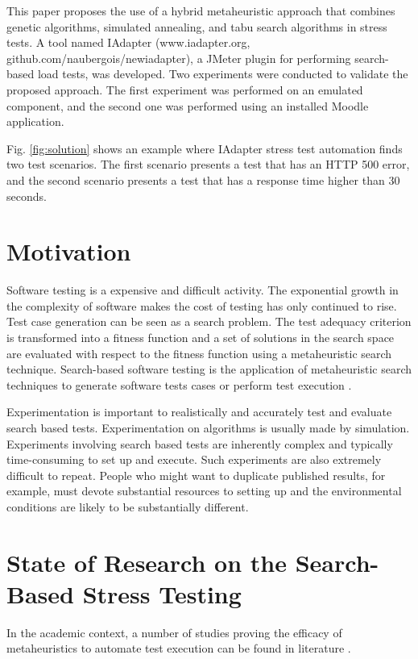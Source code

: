 This paper proposes the use of a hybrid metaheuristic approach that combines genetic algorithms, simulated annealing, and tabu search algorithms in stress tests. A tool named IAdapter (www.iadapter.org, github.com/naubergois/newiadapter), a JMeter plugin for performing search-based load tests, was developed. Two experiments were conducted to validate the proposed approach. The first experiment was performed on an emulated component, and the second one was performed using an installed Moodle application.

Fig. \ref{fig:solution} shows an example where IAdapter stress test automation finds two test scenarios. The first scenario presents a test that has an HTTP 500 error, and the second scenario presents a test that has a response time higher than 30 seconds. 


\section{Motivation}

Software testing is a expensive and difficult activity. The exponential
growth in the complexity of software makes the cost of testing has only continued to rise. Test case generation can be seen as a search problem. The test adequacy criterion is transformed into a fitness function and a set of solutions in the search
space are evaluated with respect to the fitness function using a metaheuristic search technique. Search-based software testing is the application of metaheuristic search techniques to generate software
tests cases or perform test execution \cite{Afzal2009a} \cite{Gay}.

Experimentation is important to realistically and accurately test and evaluate search based tests. Experimentation on algorithms is usually made by simulation. Experiments involving search based tests are inherently complex and typically time-consuming to set up and execute. Such experiments are also extremely difficult to repeat. People who might want to duplicate published results, for example, must devote substantial resources to setting up and the environmental conditions are likely to be substantially different.




\section{State of Research on the Search-Based Stress  Testing}

In the academic context, a number of studies proving the efficacy of metaheuristics to automate test execution can be found in literature \cite{Afzal2009a}. 


